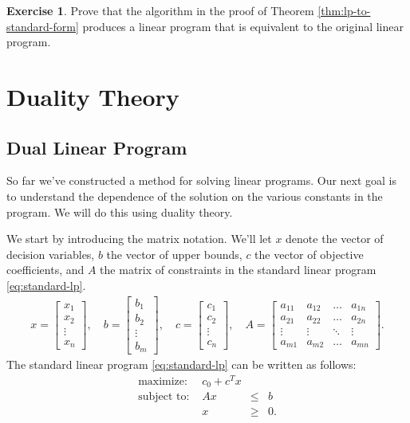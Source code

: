 \documentclass[
]{book}
\theoremstyle{definition}
\theoremstyle{definition}
\theoremstyle{definition}
\newtheorem{exercise}{Exercise}[chapter]
\theoremstyle{definition}
\theoremstyle{remark}
\begin{document}
\begin{exercise}
\protect\hypertarget{exr:lp-to-standard-form}{}\label{exr:lp-to-standard-form}Prove that the algorithm in the proof of Theorem \ref{thm:lp-to-standard-form} produces a linear program that is equivalent to the original linear program.
\end{exercise}

\hypertarget{part-duality-theory}{%
\part{Duality Theory}\label{part-duality-theory}}

\hypertarget{dual-linear-program}{%
\chapter{Dual Linear Program}\label{dual-linear-program}}

So far we've constructed a method for solving linear programs.
Our next goal is to understand the dependence of the solution on the various constants in the program.
We will do this using duality theory.

We start by introducing the matrix notation. We'll let \(x\) denote the vector of decision variables, \(b\) the vector of upper bounds, \(c\) the vector of objective coefficients, and \(A\) the matrix of constraints in the standard linear program \eqref{eq:standard-lp}.
\begin{align*}
  x = \begin{bmatrix} x_1 \\ x_2 \\ \vdots \\ x_n \end{bmatrix}, \quad
  b = \begin{bmatrix} b_1 \\ b_2 \\ \vdots \\ b_m \end{bmatrix}, \quad
  c = \begin{bmatrix} c_1 \\ c_2 \\ \vdots \\ c_n \end{bmatrix}, \quad
  A = \begin{bmatrix} a_{11} & a_{12} & \dots & a_{1n} \\
            a_{21} & a_{22} & \dots & a_{2n} \\
            \vdots & \vdots & \ddots & \vdots \\
            a_{m1} & a_{m2} & \dots & a_{mn} \end{bmatrix}.
\end{align*}
The standard linear program \eqref{eq:standard-lp} can be written as follows:
\begin{equation*}
\begin{array}{lrll}
  \mbox{maximize: } & c_0 + c^T x \\
  \mbox{subject to: } 
    & A x & \leq & b \\
    & x & \geq & 0.
\end{array}
\end{equation*}
\end{document}
